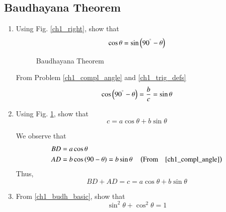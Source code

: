 \subsection{Baudhayana Theorem}
\renewcommand{\theequation}{\theenumi}
\begin{enumerate}[label=\arabic*.,ref=\thesubsection.\theenumi]



\item 	Using Fig. \ref{ch1_right}, show that
	\begin{equation}
	\cos \theta = \sin \left(90^{\degree} - \theta\right)
	\end{equation}


\begin{figure}[!ht]
	\begin{center}
		
		\resizebox{\columnwidth}{!}{}
	\end{center}
	\caption{Baudhayana Theorem}
	\label{ch1_budh_triangle}	
\end{figure}


\solution From Problem \ref{ch1_compl_angle} and  \eqref{ch1_trig_defs}
%
\begin{equation}
\label{eq:tri_90-ang}
	\cos \left(90^{\degree}-\theta\right) = \frac{b}{c} = \sin \theta
\end{equation}
%
\item
Using Fig. \ref{ch1_budh_triangle}, show that 
%
\begin{equation}
\label{ch1_budh_basic}
c = a \cos \theta + b \sin \theta
\end{equation}
%

\solution We observe that
%
\begin{align}
BD &= a \cos \theta \\
AD &= b \cos\left(90-\theta\right) = b \sin \theta \quad \left(\text{From} \quad \eqref{ch1_compl_angle}\right)
\end{align}
%
Thus,
\begin{equation}
BD + AD = c = a \cos \theta + b \sin \theta
\end{equation}
\item
From \eqref{ch1_budh_basic}, show that
%
\begin{equation}
%
\label{eq:tri_sin_cos_id}
\sin ^2 \theta + \cos ^2 \theta = 1
\end{equation}



\end{enumerate}

